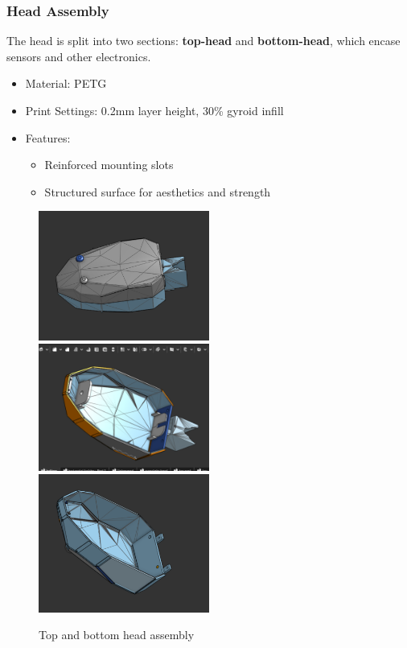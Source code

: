 \documentclass[12pt,a4paper]{report}
\begin{document}
\subsubsection{Head Assembly}

The head is split into two sections: \textbf{top-head} and \textbf{bottom-head}, which encase sensors and other electronics.

\begin{itemize}
\item Material: PETG
\item Print Settings: 0.2mm layer height, 30\%  gyroid infill
\item Features:
\begin{itemize}
\item Reinforced mounting slots
\item Structured surface for aesthetics and strength
\end{itemize}
\end{itemize}
\begin{figure}[h]
\centering
\includegraphics[width=0.5\textwidth]{media/Head.png}
\includegraphics[width=0.5\textwidth]{media/Bottom-Head.png}
\includegraphics[width=0.5\textwidth]{media/top-head.png}
\caption{Top and bottom head assembly}
\end{figure}
\end{document}
